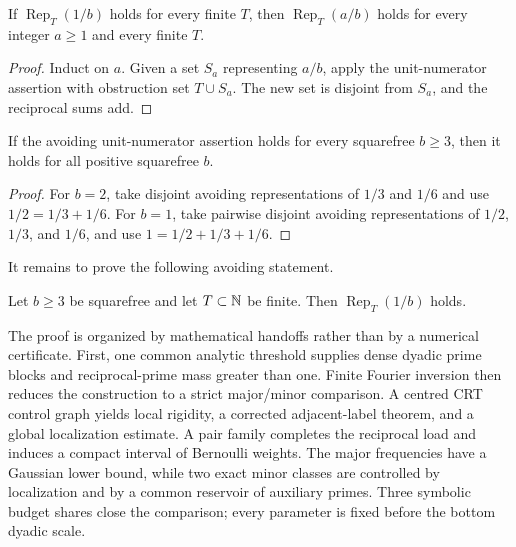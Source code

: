 \begin{lemma}\label{lem:numerator-reduction}
If $\operatorname{Rep}_T(1/b)$ holds for every finite $T$, then
$\operatorname{Rep}_T(a/b)$ holds for every integer $a\ge1$ and every finite
$T$.
\end{lemma}
\begin{proof}
Induct on $a$.  Given a set $S_a$ representing $a/b$, apply the unit-numerator
assertion with obstruction set $T\cup S_a$.  The new set is disjoint from
$S_a$, and the reciprocal sums add.
\end{proof}

\begin{lemma}\label{lem:small-b}
If the avoiding unit-numerator assertion holds for every squarefree $b\ge3$,
then it holds for all positive squarefree $b$.
\end{lemma}
\begin{proof}
For $b=2$, take disjoint avoiding representations of $1/3$ and $1/6$ and use
$1/2=1/3+1/6$.  For $b=1$, take pairwise disjoint avoiding representations of
$1/2$, $1/3$, and $1/6$, and use $1=1/2+1/3+1/6$.
\end{proof}

It remains to prove the following avoiding statement.

\begin{theorem}\label{thm:structural-construction}
Let $b\ge3$ be squarefree and let $T\subset\mathbb N$ be finite.  Then
$\operatorname{Rep}_T(1/b)$ holds.
\end{theorem}

The proof is organized by mathematical handoffs rather than by a numerical
certificate.  First, one common analytic threshold supplies dense dyadic prime
blocks and reciprocal-prime mass greater than one.  Finite Fourier inversion
then reduces the construction to a strict major/minor comparison.  A centred
CRT control graph yields local rigidity, a corrected adjacent-label theorem,
and a global localization estimate.  A pair family completes the reciprocal
load and induces a compact interval of Bernoulli weights.  The major frequencies
have a Gaussian lower bound, while two exact minor classes are controlled by
localization and by a common reservoir of auxiliary primes.  Three symbolic
budget shares close the comparison; every parameter is fixed before the bottom
dyadic scale.
